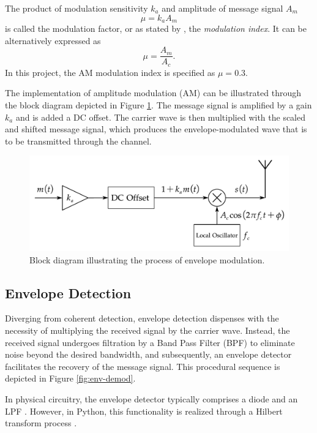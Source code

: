 \documentclass[../ECE459FinalProjectReport.tex]{subfiles}
\begin{document}
The product of modulation sensitivity $k_a$ and amplitude of message signal $A_m$
\begin{equation}
    \mu = k_a A_m
\end{equation}
is called the modulation factor, or as stated by \cite{sasmitaModulationIndexModulation2020}, the \textit{modulation index}. It can be alternatively expressed as
\begin{equation}
    \mu = \frac{A_m}{A_c}.
\end{equation}
In this project, the AM modulation index is specified as $\mu=0.3$.

The implementation of amplitude modulation (AM) can be illustrated through the block diagram depicted in Figure \ref{fig:env-mod}. The message signal is amplified by a gain $k_a$ and is added a DC offset. The carrier wave is then multiplied with the scaled and shifted message signal, which produces the envelope-modulated wave that is to be transmitted through the channel.
\begin{figure}[b]
    \centering
    \includegraphics[scale=0.6]{plots/env_mod.pdf}
    \caption{Block diagram illustrating the process of envelope modulation.}
    \label{fig:env-mod}
\end{figure}

\subsection{Envelope Detection}
Diverging from coherent detection, envelope detection dispenses with the necessity of multiplying the received signal by the carrier wave. Instead, the received signal undergoes filtration by a Band Pass Filter (BPF) to eliminate noise beyond the desired bandwidth, and subsequently, an envelope detector facilitates the recovery of the message signal. This procedural sequence is depicted in Figure \ref{fig:env-demod}.

In physical circuitry, the envelope detector typically comprises a diode and an LPF \cite{AnalogCommunicationAM}. However, in Python, this functionality is realized through a Hilbert transform process \cite{ulrichEnvelopeCalculationHilbert2006, XiXiaoShengPythonTiQuXinHaoDeBaoLuoGet2023}.
\end{document}
